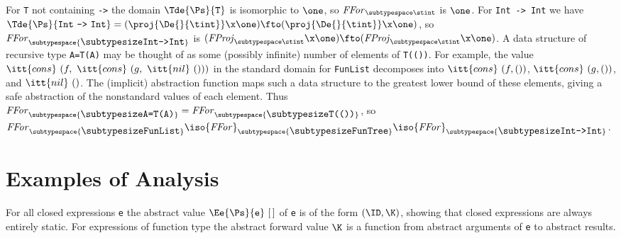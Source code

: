 \documentclass[11pt]{article}
\begin{document}
For \mbox{\tt T} not containing \mbox{\tt ->} the domain $\Tde{\Ps}{\mbox{\tt T}}$ is isomorphic
to $\one$, so ${\it{}FFor}_{\subtypespace\stint}$ is $\one$.  For \mbox{\tt Int}\ \mbox{\tt ->}\ \mbox{\tt Int}
we have
$\Tde{\Ps}{\mbox{\tt Int}\ \mbox{\tt ->}\ \mbox{\tt Int}}=(\proj{\De{}{\tint}}\x\one)\fto(\proj{\De{}{\tint}}\x\one)$,
so ${\it{}FFor}_{\subtypespace{\makebox{\subtypesize\tt Int->Int}} }$ is
$({\it{}FProj}_{\subtypespace\stint}\x\one)\fto({\it{}FProj}_{\subtypespace\stint}\x\one)$.  A
data structure of recursive type \mbox{\tt A=T(A)} may be thought of as some
(possibly infinite) number of elements of \mbox{\tt T(())}.  For example, the
value $\itt{cons}\ (f,\ \itt{cons}\ (g,\ \itt{nil}\ ()))$ in the
standard domain for \mbox{\tt FunList} decomposes into $\itt{cons}\ (f,())$,
$\itt{cons}\ (g,())$, and $\itt{nil}\ ()$.  The (implicit) abstraction
function maps such a data structure to the greatest lower bound of
these elements, giving a safe abstraction of the nonstandard values of
each element.  Thus
${\it{}FFor}_{\subtypespace{\makebox{\subtypesize\tt A=T(A)}} }={\it{}FFor}_{\subtypespace{\makebox{\subtypesize\tt T(())}} }$, so
${\it{}FFor}_{\subtypespace{\makebox{\subtypesize\tt FunList}} }\iso{\it{}FFor}_{\subtypespace{\makebox{\subtypesize\tt FunTree}} }\iso{\it{}FFor}_{\subtypespace{\makebox{\subtypesize\tt Int->Int}} }$.



\section{Examples of Analysis}

For all closed expressions \mbox{\tt e} the abstract value
$\Ee{\Ps}{\mbox{\tt e}}~[\,]$ of \mbox{\tt e} is of the form $(\ID,\K)$, showing
that closed expressions are always entirely static.  For expressions of
function type the abstract forward value $\K$ is a function from
abstract arguments of \mbox{\tt e} to abstract results.
\end{document}
